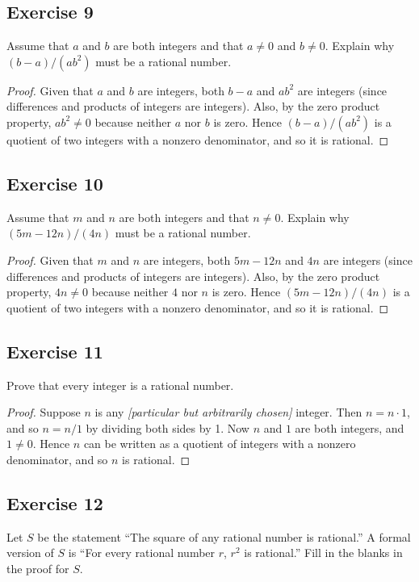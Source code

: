 \documentclass[14pt]{extarticle}
\begin{document}
\subsection{Exercise 9}
Assume that $a$ and $b$ are both integers and that $a \neq 0$ and $b \neq 0$. Explain why $(b - a)/(ab^2)$ must be a rational number.

\begin{proof}
Given that $a$ and $b$ are integers, both $b - a$ and $ab^2$ are integers (since differences and products of integers are integers). Also, by the zero product property, $ab^2 \neq 0$ because neither $a$ nor $b$ is zero. Hence $(b - a)/(ab^2)$ is a quotient of two integers with a nonzero denominator, and so it is rational.
\end{proof}

\subsection{Exercise 10}
Assume that $m$ and $n$ are both integers and that $n \neq 0$. Explain why $(5m - 12n)/(4n)$ must be a rational number.

\begin{proof}
Given that $m$ and $n$ are integers, both $5m - 12n$ and $4n$ are integers (since differences and products of integers are integers). Also, by the zero product property, $4n \neq 0$ because neither $4$ nor $n$ is zero. Hence $(5m - 12n)/(4n)$ is a quotient of two integers with a nonzero denominator, and so it is rational.
\end{proof}

\subsection{Exercise 11}
Prove that every integer is a rational number.

\begin{proof}
Suppose $n$ is any {\it[particular but arbitrarily chosen]}
integer. Then $n = n\cdot 1$, and so $n = n/1$ by dividing both sides by 1. Now $n$ and $1$ are both integers, and $1 \neq 0$. Hence $n$ can be written as a quotient of integers with a nonzero denominator, and so $n$ is rational.
\end{proof}

\subsection{Exercise 12}
Let $S$ be the statement “The square of any rational number is rational.” A formal version of $S$ is “For every rational number $r$, $r^2$ is rational.” Fill in the blanks in the proof for $S$.
\end{document}
